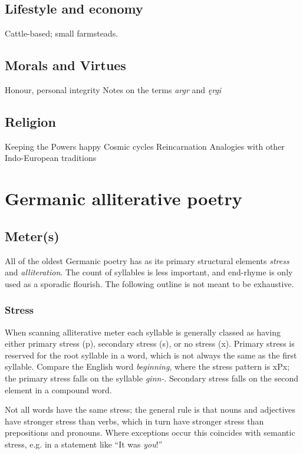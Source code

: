   \subsection{Lifestyle and economy}
    Cattle-based; small farmsteads.
  \subsection{Morals and Virtues}
    Honour, personal integrity
    Notes on the terms \emph{argr} and \emph{ęrgi}
  \subsection{Religion}
    Keeping the Powers happy
    Cosmic cycles
    Reincarnation
    Analogies with other Indo-European traditions

\section{Germanic alliterative poetry}

  \subsection{Meter(s)}
    All of the oldest Germanic poetry has as its primary structural elements \emph{stress} and \emph{alliteration}.  The count of syllables is less important, and end-rhyme is only used as a sporadic flourish.  The following outline is not meant to be exhaustive.

    \subsubsection{Stress}
    When scanning alliterative meter each syllable is generally classed as having either primary stress (p), secondary stress (s), or no stress (x).  Primary stress is reserved for the root syllable in a word, which is not always the same as the first syllable.  Compare the English word \emph{beginning}, where the stress pattern is xPx; the primary stress falls on the syllable \emph{ginn-}.  Secondary stress falls on the second element in a compound word.

    Not all words have the same stress; the general rule is that nouns and adjectives have stronger stress than verbs, which in turn have stronger stress than prepositions and pronouns.  Where exceptions occur this coincides with semantic stress, e.g. in a statement like “It was \emph{you}!”


